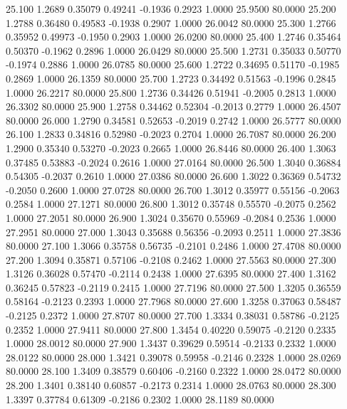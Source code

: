   25.100   1.2689   0.35079   0.49241  -0.1936   0.2923   1.0000  25.9500  80.0000
  25.200   1.2788   0.36480   0.49583  -0.1938   0.2907   1.0000  26.0042  80.0000
  25.300   1.2766   0.35952   0.49973  -0.1950   0.2903   1.0000  26.0200  80.0000
  25.400   1.2746   0.35464   0.50370  -0.1962   0.2896   1.0000  26.0429  80.0000
  25.500   1.2731   0.35033   0.50770  -0.1974   0.2886   1.0000  26.0785  80.0000
  25.600   1.2722   0.34695   0.51170  -0.1985   0.2869   1.0000  26.1359  80.0000
  25.700   1.2723   0.34492   0.51563  -0.1996   0.2845   1.0000  26.2217  80.0000
  25.800   1.2736   0.34426   0.51941  -0.2005   0.2813   1.0000  26.3302  80.0000
  25.900   1.2758   0.34462   0.52304  -0.2013   0.2779   1.0000  26.4507  80.0000
  26.000   1.2790   0.34581   0.52653  -0.2019   0.2742   1.0000  26.5777  80.0000
  26.100   1.2833   0.34816   0.52980  -0.2023   0.2704   1.0000  26.7087  80.0000
  26.200   1.2900   0.35340   0.53270  -0.2023   0.2665   1.0000  26.8446  80.0000
  26.400   1.3063   0.37485   0.53883  -0.2024   0.2616   1.0000  27.0164  80.0000
  26.500   1.3040   0.36884   0.54305  -0.2037   0.2610   1.0000  27.0386  80.0000
  26.600   1.3022   0.36369   0.54732  -0.2050   0.2600   1.0000  27.0728  80.0000
  26.700   1.3012   0.35977   0.55156  -0.2063   0.2584   1.0000  27.1271  80.0000
  26.800   1.3012   0.35748   0.55570  -0.2075   0.2562   1.0000  27.2051  80.0000
  26.900   1.3024   0.35670   0.55969  -0.2084   0.2536   1.0000  27.2951  80.0000
  27.000   1.3043   0.35688   0.56356  -0.2093   0.2511   1.0000  27.3836  80.0000
  27.100   1.3066   0.35758   0.56735  -0.2101   0.2486   1.0000  27.4708  80.0000
  27.200   1.3094   0.35871   0.57106  -0.2108   0.2462   1.0000  27.5563  80.0000
  27.300   1.3126   0.36028   0.57470  -0.2114   0.2438   1.0000  27.6395  80.0000
  27.400   1.3162   0.36245   0.57823  -0.2119   0.2415   1.0000  27.7196  80.0000
  27.500   1.3205   0.36559   0.58164  -0.2123   0.2393   1.0000  27.7968  80.0000
  27.600   1.3258   0.37063   0.58487  -0.2125   0.2372   1.0000  27.8707  80.0000
  27.700   1.3334   0.38031   0.58786  -0.2125   0.2352   1.0000  27.9411  80.0000
  27.800   1.3454   0.40220   0.59075  -0.2120   0.2335   1.0000  28.0012  80.0000
  27.900   1.3437   0.39629   0.59514  -0.2133   0.2332   1.0000  28.0122  80.0000
  28.000   1.3421   0.39078   0.59958  -0.2146   0.2328   1.0000  28.0269  80.0000
  28.100   1.3409   0.38579   0.60406  -0.2160   0.2322   1.0000  28.0472  80.0000
  28.200   1.3401   0.38140   0.60857  -0.2173   0.2314   1.0000  28.0763  80.0000
  28.300   1.3397   0.37784   0.61309  -0.2186   0.2302   1.0000  28.1189  80.0000

